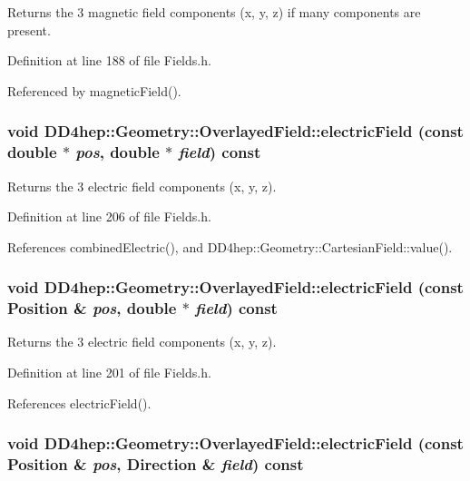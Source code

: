 Returns the 3 magnetic field components (x, y, z) if many components are present. 

Definition at line 188 of file Fields.h.

Referenced by magneticField().\hypertarget{class_d_d4hep_1_1_geometry_1_1_overlayed_field_adf8eafcce3969010f3f8d39f9e09b3a9}{
\subsubsection[{electricField}]{\setlength{\rightskip}{0pt plus 5cm}void DD4hep::Geometry::OverlayedField::electricField (const double $\ast$ {\em pos}, \/  double $\ast$ {\em field}) const}}
\label{class_d_d4hep_1_1_geometry_1_1_overlayed_field_adf8eafcce3969010f3f8d39f9e09b3a9}


Returns the 3 electric field components (x, y, z). 

Definition at line 206 of file Fields.h.

References combinedElectric(), and DD4hep::Geometry::CartesianField::value().\hypertarget{class_d_d4hep_1_1_geometry_1_1_overlayed_field_a12a09e1c0e21fb6cbbfc80b252a010c2}{
\subsubsection[{electricField}]{\setlength{\rightskip}{0pt plus 5cm}void DD4hep::Geometry::OverlayedField::electricField (const {\bf Position} \& {\em pos}, \/  double $\ast$ {\em field}) const}}
\label{class_d_d4hep_1_1_geometry_1_1_overlayed_field_a12a09e1c0e21fb6cbbfc80b252a010c2}


Returns the 3 electric field components (x, y, z). 

Definition at line 201 of file Fields.h.

References electricField().\hypertarget{class_d_d4hep_1_1_geometry_1_1_overlayed_field_a4b87593d18f3b7c4a675231a0a978dba}{
\subsubsection[{electricField}]{\setlength{\rightskip}{0pt plus 5cm}void DD4hep::Geometry::OverlayedField::electricField (const {\bf Position} \& {\em pos}, \/  {\bf Direction} \& {\em field}) const}}
\label{class_d_d4hep_1_1_geometry_1_1_overlayed_field_a4b87593d18f3b7c4a675231a0a978dba}



